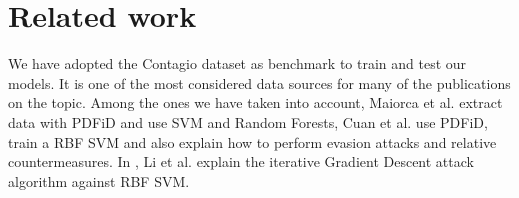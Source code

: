 \documentclass[twocolumn, switch]{article} %
\begin{document}
\section{Related work}
\label{sec:relatedwork}
We have adopted the Contagio dataset \cite{Contagio} as benchmark to train and test our models. It is one of the most considered data sources for many of the publications on the topic. Among the ones we have taken into account, Maiorca et al. \cite{maiorca_giacinto_corona_1970} extract data with PDFiD \cite{PDFiD} and use SVM and Random Forests,  Cuan et al. \cite{cuan_damien_delaplace_valois_2018} use PDFiD, train a RBF SVM and also explain how to perform evasion attacks and relative countermeasures. In \cite{li_liu_yan_yang_2022}, Li et al. explain the iterative Gradient Descent attack algorithm against RBF SVM.

\end{document}
